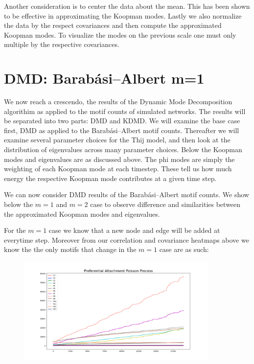\vspace{3mm}

Another consideration is to center the data about the mean. This has been shown to be effective in
approximating the Koopman modes. Lastly we also normalize the data by the respect covariances 
and then compute the approximated Koopman modes. To visualize the modes on the previous scale 
one must only multiple by the respective covariances. 


\section{DMD: Barabási–Albert m=1}
We now reach a crescendo, the results of the Dynamic Mode Decomposition algorithim as applied to the
motif counts of simulated networks. The results will be separated into two parts: DMD and KDMD. We will examine the base case first, DMD as applied to the 
Barabási–Albert motif counts. Thereafter we will examine several parameter choices for the Thij model,
and then look at the distribution of eigenvalues across many parameter choices. Below the Koopman modes
and eigenvalues are as discussed above. The phi modes are simply the weighting of each Koopman mode 
at each timestep. These tell us how much energy the respective Koopman mode contributes at a given time
step.

We can now consider DMD results of the Barabási–Albert motif counts. We show below
the $m=1$ and $m=2$ case to observe difference and similarities between the approximated 
Koopman modes and eigenvalues. 

For the $m=1$ case we know that a new node and edge will be added at everytime step. Moreover from our
correlation and covariance heatmaps above we know the the only motifs that change in the $m=1$ case 
are as such: 

\newpage

\begin{figure}
    \includegraphics[width=10cm]{Images/poissonprocess_pref_attach_1.png}
    \centering
\end{figure}

